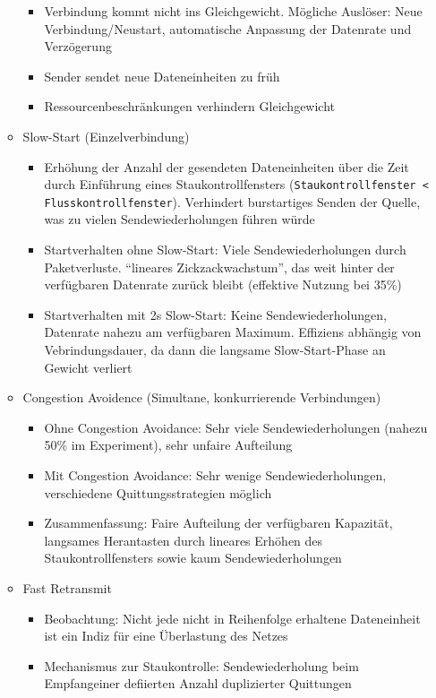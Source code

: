 \begin{itemize}
\begin{itemize}
		\begin{itemize}
			\item Verbindung kommt nicht ins Gleichgewicht. Mögliche Auslöser: Neue Verbindung/Neustart, automatische Anpassung der Datenrate und Verzögerung
			\item Sender sendet neue Dateneinheiten zu früh
			\item Ressourcenbeschränkungen verhindern Gleichgewicht
		\end{itemize}
		\item Slow-Start (Einzelverbindung)
		\begin{itemize}
			\item Erhöhung der Anzahl der gesendeten Dateneinheiten über die Zeit durch Einführung eines Staukontrollfensters (\texttt{Staukontrollfenster < Flusskontrollfenster}). Verhindert burstartiges Senden der Quelle, was zu vielen Sendewiederholungen führen würde
			\item Startverhalten ohne Slow-Start: Viele Sendewiederholungen durch Paketverluste. "`lineares Zickzackwachstum"', das weit hinter der verfügbaren Datenrate zurück bleibt (effektive Nutzung bei 35\%)
			\item Startverhalten mit 2s Slow-Start: Keine Sendewiederholungen, Datenrate nahezu am verfügbaren Maximum. Effiziens abhängig von Vebrindungsdauer, da dann die langsame Slow-Start-Phase an Gewicht verliert
		\end{itemize}
		\item Congestion Avoidence (Simultane, konkurrierende Verbindungen)
		\begin{itemize}
			\item Ohne Congestion Avoidance: Sehr viele Sendewiederholungen (nahezu 50\% im Experiment), sehr unfaire Aufteilung
			\item Mit Congestion Avoidance: Sehr wenige Sendewiederholungen, verschiedene Quittungsstrategien möglich
			\item Zusammenfassung: Faire Aufteilung der verfügbaren Kapazität, langsames Herantasten durch lineares Erhöhen des Staukontrollfensters sowie kaum Sendewiederholungen
		\end{itemize}
		\item Fast Retransmit
		\begin{itemize}
			\item Beobachtung: Nicht jede nicht in Reihenfolge erhaltene Dateneinheit ist ein Indiz für eine Überlastung des Netzes
			\item Mechanismus zur Staukontrolle: Sendewiederholung beim Empfangeiner defiierten Anzahl duplizierter Quittungen

\end{itemize}
\end{itemize}
\end{itemize}
